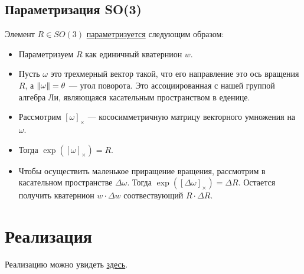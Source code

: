 \subsection{Параметризация SO(3)}
Элемент $R \in SO(3)$ \href{https://github.com/QuantumMechanicus/camera_calibration_test/blob/dev/core/utils/Local_Parametrization_SO3.h}{параметризуется}  следующим образом:
\begin{itemize}
	\item Параметризуем $R$ как единичный кватернион $w$.
	\item Пусть $\omega$ это трехмерный вектор такой, что его направление это ось вращения $R$, а $\left\lVert\omega\right\rVert = \theta$ --- угол поворота. Это ассоциированная с нашей группой алгебра Ли, являющаяся касательным пространством в еденице.
	\item Рассмотрим $[\omega]_{\times}$ --- кососимметричную матрицу векторного умножения на $\omega$.
	\item Тогда $\exp{([\omega]_{\times})} = R$.
	\item Чтобы осуществить маленькое приращение вращения, рассмотрим в касательном пространстве $\Delta \omega$. Тогда $\exp{([\Delta \omega]_{\times})} = \Delta R$. Остается получить кватернион $w \cdot \Delta w$ соотвествующий $R\cdot \Delta R$. 
\end{itemize}

\section{Реализация}
Реализацию можно увидеть \href{https://github.com/QuantumMechanicus/camera_calibration_test/tree/dev/subroutines/global_non_linear_optimizer}{здесь}.